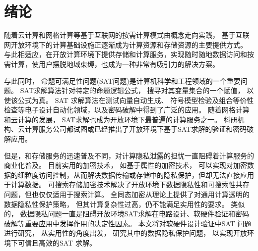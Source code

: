 \chapter{绪论}
%
%

随着云计算和网格计算等基于互联网的按需计算模式由概念走向实践，
基于互联网开放环境下的计算基础设施正逐渐成为计算资源和存储资源的主要提供方式。
与此相适应，在开放计算环境下提供存储和计算服务，实现随时随地数据访问和按需计算，使用户摆脱地域束缚，也成为一种非常有吸引力的解决方案。

与此同时，
命题可满足性问题(SAT问题)是计算机科学和工程领域的一个重要问题。
SAT求解算法针对特定的命题逻辑公式，
搜寻对其变量集合的一个赋值，
以使该公式为真。
SAT 求解算法在测试向量自动生成、
符号模型检验及组合等价性检查等电子设计自动化领域，以及密码破解中得到了广泛的应用。
随着网格计算和云计算的发展，
SAT求解也成为开放环境下最普遍的计算服务之一。
科研机构、云计算服务公司都试图或已经推出了开放环境下基于SAT求解的验证和密码破解应用。

但是，和存储服务的迅速普及不同，对计算隐私泄露的担忧一直阻碍着计算服务的商业化普及。
目前实用的加密技术，
如基于属性的加密技术，
可以实现对加密数据的细粒度访问控制，从而解决数据传输或存储中的隐私保护，但却无法直接应用于计算数据。
可搜索存储加密技术解决了开放环境下数据隐私性和可搜索性共存问题，但也仅仅适用于搜索计算。
全同态加密从理论上提供了对通用计算透明的数据隐私性保护策略，
但其计算复杂性过高，仍不能满足实用性的要求。
类似的，
数据隐私问题一直是阻碍开放环境SAT求解在电路设计、软硬件验证和密码破解等重要应用中发挥作用的决定性因素。
本文将对软硬件设计验证中SAT 问题进行研究，
从实用性的角度出发，
研究其中的数据隐私保护问题，
以实现开放环境下可信且高效的SAT 求解。

